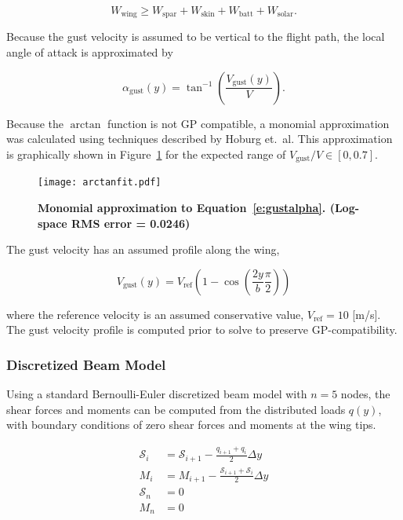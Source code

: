 \begin{equation}
    W_{\text{wing}} \geq W_{\text{spar}} + W_{\text{skin}} + W_{\text{batt}} + W_{\text{solar}}.
\end{equation}

Because the gust velocity is assumed to be vertical to the flight path, the local angle of attack is approximated by 

\begin{equation}
    \label{e:gustalpha}
    \alpha_{\text{gust}}(y)  = \tan^{-1}\left(\frac{V_{\text{gust}}(y)}{V} \right).
\end{equation}

Because the $\arctan$ function is not GP compatible, a monomial approximation was calculated using techniques described by Hoburg et.~al\cite{fitting}.
This approximation is graphically shown in Figure~\ref{f:arctanfit} for the expected range of $V_{\text{gust}}/V \in [0, 0.7]$.  

\begin{figure}[H]
	\begin{center}
	\texttt{[image: arctanfit.pdf]}
    \caption{\textbf{Monomial approximation to Equation~\ref{e:gustalpha}. (Log-space RMS error = 0.0246)}}
	\label{f:arctanfit}
	\end{center}
\end{figure}

The gust velocity has an assumed profile along the wing\cite{acgust},

\begin{equation}
    \label{e:gustwind}
    V_{\text{gust}}(y) = V_{\text{ref}} \left(1-\cos\left(\frac{2y}{b} \frac{\pi}{2} \right) \right)
\end{equation}

where the reference velocity is an assumed conservative value\cite{acgust}, $V_{\text{ref}} = 10$ [m/s]. The gust velocity profile is computed prior to solve to preserve GP-compatibility.

\subsubsection{Discretized Beam Model}

Using a standard Bernoulli-Euler discretized beam model with $n=5$ nodes, the shear forces and moments can be computed from the distributed loads $q(y)$, with boundary conditions of zero shear forces and moments at the wing tips.\cite{bending}

\begin{align}
    \label{e:shear}
    \mathcal{S}_i &= \mathcal{S}_{i+1} - \frac{q_{i+1} + q_i}{2}\Delta y \\
    \label{e:moment}
    M_i &= M_{i+1} - \frac{\mathcal{S}_{i+1} + \mathcal{S}_i}{2}\Delta y \\
    \label{e:shearboundary}
    \mathcal{S}_n &= 0 \\
    \label{e:momentboundary}
    M_n &= 0
\end{align}

